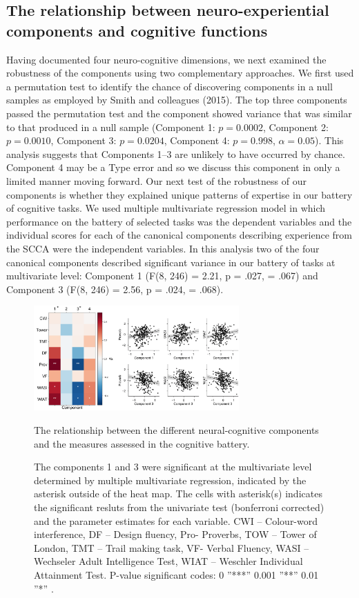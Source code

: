 \subsection{The relationship between neuro-experiential components and cognitive functions}
\label{study2:results:manova}
Having documented four neuro-cognitive dimensions, we next examined the robustness of the components using two complementary approaches. We first used a permutation test to identify the chance of discovering components in a null samples as employed by Smith and colleagues (2015). The top three components passed the permutation test and the  component showed variance that was similar to that produced in a null sample
(Component 1: \(\mathit{p} = 0.0002\),
Component 2: \(\mathit{p} = 0.0010\),
Component 3: \(\mathit{p} = 0.0204\),
Component 4: \(\mathit{p} = 0.998\),
\(\alpha = 0.05\)).
This analysis suggests that Components 1--3 are unlikely to have occurred by chance. Component 4 may be a Type  error and so we discuss this component in only a limited manner moving forward.
Our next test of the robustness of our components is whether they explained unique patterns of expertise in our battery of cognitive tasks. We used multiple multivariate regression model in which performance on the battery of selected tasks was the dependent variables and the individual scores for each of the canonical components describing experience from the SCCA were the independent variables. In this analysis two of the four canonical components described significant variance in our battery of tasks at multivariate level: Component 1 (F(8, 246) = 2.21, p = .027, \paretasquared = .067) and Component 3 (F(8, 246) = 2.56, p = .024, \paretasquared = .068).
\begin{figure}[H]
    \centering
    \includegraphics[width=0.7\textwidth]{study2/image/study2fig3.png}
    \caption{The relationship between the different neural-cognitive components and the measures assessed in the cognitive battery.}
    \caption*{
    \footnotesize{
    The components 1 and 3 were significant at the multivariate level determined by multiple multivariate regression, indicated by the asterisk outside of the heat map. The cells with asterisk(s) indicates the significant resluts from the univariate test (bonferroni corrected) and the parameter estimates for each variable. CWI – Colour-word interference, DF – Design fluency, Pro- Proverbs, TOW – Tower of London, TMT – Trail making task, VF- Verbal Fluency, WASI – Wechseler Adult Intelligence Test, WIAT – Weschler Individual Attainment Test. P-value significant codes:  0 ”***” 0.001 ”**” 0.01 ”*” .}
    }
    \label{fig:study2:fig3}
\end{figure}
